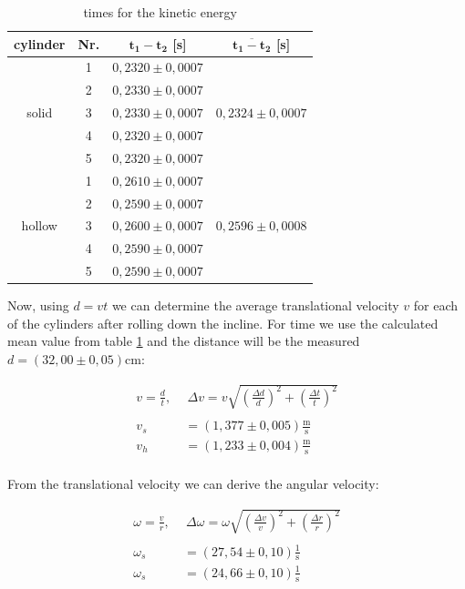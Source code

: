 \documentclass{article}
\begin{document}
\begin{table} [!ht]
    \centering
    \begin{tabular}{c|c|c|c}
        \hline
        \textbf{cylinder} & \textbf{Nr.} & $\bm{t_1-t_2}$ [s] & $\bm{\overline{t_1-t_2}}$ [s] \\ \hline
         & 1 & $0,2320 \pm 0,0007$ &  \\
         & 2 & $0,2330 \pm 0,0007$ &  \\
        solid & 3 & $0,2330 \pm 0,0007$ & $0,2324 \pm 0,0007$ \\
         & 4 & $0,2320 \pm 0,0007$ &  \\
         & 5 & $0,2320 \pm 0,0007$ &  \\ \hline
         & 1 & $0,2610 \pm 0,0007$ &  \\
         & 2 & $0,2590 \pm 0,0007$ &  \\
        hollow & 3 & $0,2600 \pm 0,0007$ & $0,2596 \pm 0,0008$ \\
         & 4 & $0,2590 \pm 0,0007$ &  \\
         & 5 & $0,2590 \pm 0,0007$ &  \\ \hline
    \end{tabular}
    \caption{times for the kinetic energy}
    \label{tab:2}
\end{table}

Now, using $d=vt$ we can determine the average translational velocity $v$ for each of the cylinders after rolling down the incline. For time we use the calculated mean value from table \ref{tab:2} and the distance will be the measured $d=(32,00\pm0,05)$cm:

\begin{equation}
    \begin{split}
        v=\frac{d}{t}, \ & \ \Delta v = v \sqrt{\left( \frac{\Delta d}{d} \right)^2 + \left( \frac{\Delta t}{t} \right)^2} \\ \\
        v_s &= (1,377 \pm 0,005) \frac{\text{m}}{\text{s}} \\
        v_h &= (1,233 \pm 0,004) \frac{\text{m}}{\text{s}} \\
    \end{split}
    \label{res:v}
\end{equation}

From the translational velocity we can derive the angular velocity:

\begin{equation}
    \begin{split}
        \omega = \frac{v}{r}, \ & \ \Delta \omega = \omega \sqrt{\left( \frac{\Delta v}{v} \right)^2 + \left( \frac{\Delta r}{r} \right)^2} \\ \\
        \omega_s &= (27,54 \pm 0,10) \frac{\text{1}}{\text{s}} \\
        \omega_s &= (24,66 \pm 0,10) \frac{\text{1}}{\text{s}} \\
    \end{split}
    \label{res:angularvel}
\end{equation}
\end{document}
